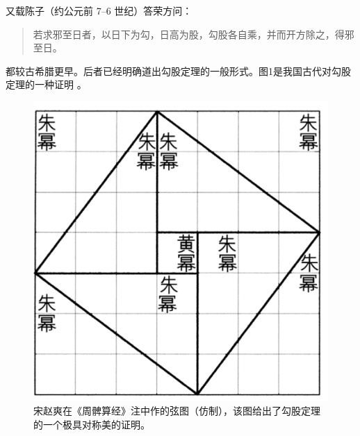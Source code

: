 \documentclass[UTF8] {ctexart}
\newenvironment{myquote}            %
{\begin{quote}\kaishu\zihao{-5}}    %
{\end{quote}}                       %
\begin{document}
又载陈子（约公元前 7--6 世纪）答荣方问：
\begin{myquote}
若求邪至日者，以日下为勾，日高为股，勾股各自乘，并而开方除之，得邪至日。
\end{myquote}
都较古希腊更早。后者已经明确道出勾股定理的一般形式。图1是我国古代对勾股定理的一种证明 \cite{quanjing}。    %
\begin{figure}[ht]  %
    \centering  %
    \includegraphics[scale=0.6]{image_xiantu.png}
    \caption{\kaishu 宋赵爽在《周髀算经》注中作的弦图（仿制），该图给出了勾股定理的一个极具对称美的证明\cite{quanjing}。} %
    \label{fig:xiantu}  %
\end{figure}
\end{document}
